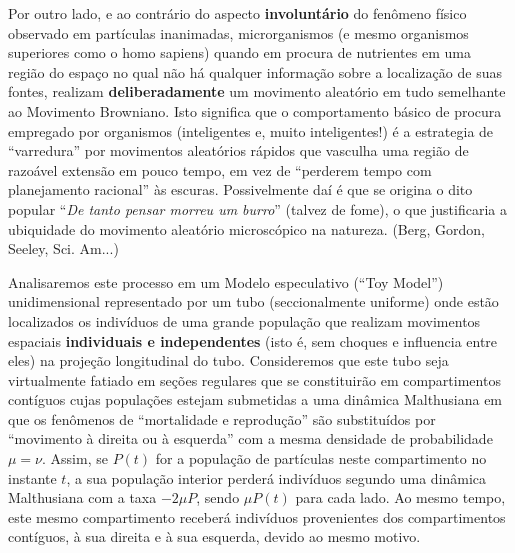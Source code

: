     Por outro lado, e ao contrário do aspecto \textbf{involuntário} do fenômeno físico observado em partículas inanimadas, microrganismos (e mesmo organismos superiores como o homo sapiens) quando em procura de nutrientes em uma região do espaço no qual não há qualquer informação sobre a localização de suas fontes, realizam \textbf{deliberadamente} um movimento aleatório em tudo semelhante ao Movimento Browniano. Isto significa que o comportamento básico de procura empregado por organismos (inteligentes e, muito inteligentes!) é a estrategia de ``varredura'' por movimentos aleatórios rápidos que vasculha uma região de razoável extensão em pouco tempo, em vez de ``perderem tempo com planejamento racional'' às escuras. Possivelmente daí é que se origina o dito popular ``\textit{De tanto pensar morreu um burro}'' (talvez de fome), o que justificaria a ubiquidade do movimento aleatório microscópico na natureza. (Berg, Gordon, Seeley, Sci. Am...)

    Analisaremos este processo em um Modelo especulativo (``Toy Model'') unidimensional representado por um tubo (seccionalmente uniforme) onde estão localizados os indivíduos de uma grande população que realizam movimentos espaciais \textbf{individuais e independentes} (isto é, sem choques e influencia entre eles) na projeção longitudinal do tubo. Consideremos que este tubo seja virtualmente fatiado em seções regulares que se constituirão em compartimentos contíguos cujas populações estejam submetidas a uma dinâmica Malthusiana em que os fenômenos de ``mortalidade e reprodução'' são substituídos por ``movimento à direita ou à esquerda'' com a mesma densidade de probabilidade \(\mu = \nu\). Assim, se \(P(t)\) for a população de partículas neste compartimento no instante \(t\), a sua população interior perderá indivíduos segundo uma dinâmica Malthusiana com a taxa \(-2\mu P\), sendo \(\mu P(t)\) para cada lado. Ao mesmo tempo, este mesmo compartimento receberá indivíduos provenientes dos compartimentos contíguos, à sua direita e à sua esquerda, devido ao mesmo motivo.


